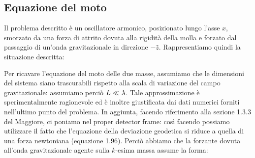 \documentclass[a4paper,10pt]{article}
\newcommand{\lambdabar}{\lambda\mkern-9mu\raisebox{0.4ex}{–}}
\begin{document}
\subsection{Equazione del moto}

Il problema descritto è un oscillatore armonico, posizionato lungo l'asse $x$, smorzato da una forza di attrito dovuta alla rigidità della molla e forzato dal passaggio di un'onda gravitazionale in direzione $-\hat z$. Rappresentiamo quindi la situazione descritta:

\begin{center}
\end{center}


Per ricavare l'equazione del moto delle due masse, assumiamo che le dimensioni del sistema siano trascurabili rispetto alla scala di variazione del campo gravitazionale: assumiamo perciò $L \ll \lambdabar$.
Tale approssimazione è sperimentalmente ragionevole ed è inoltre giustificata dai dati numerici forniti nell'ultimo punto del problema.
In aggiunta, facendo riferimento alla sezione 1.3.3 del Maggiore, ci poniamo nel proper detector frame: così facendo possiamo utilizzare il fatto che l'equazione della deviazione geodetica si riduce a quella di una forza newtoniana (equazione 1.96).
Perciò abbiamo che la forzante dovuta all'onda gravitazionale agente sulla $k$-esima massa assume la forma:
\end{document}
